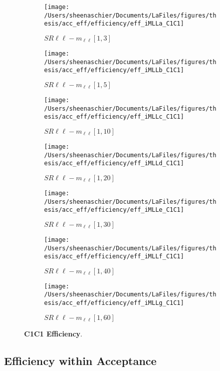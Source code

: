 \begin{figure}
        \centering
    \begin{subfigure}[b]{0.44\textwidth}
        \texttt{[image: /Users/sheenaschier/Documents/LaFiles/figures/thesis/acc\_eff/efficiency/eff\_iMLLa\_C1C1]}
    \caption{$SR\ell\ell-m_{\ell\ell} [1, 3]$}
    \end{subfigure}
    \begin{subfigure}[b]{0.44\textwidth}
        \texttt{[image: /Users/sheenaschier/Documents/LaFiles/figures/thesis/acc\_eff/efficiency/eff\_iMLLb\_C1C1]}
    \caption{$SR\ell\ell-m_{\ell\ell} [1, 5]$}
    \end{subfigure}
    \begin{subfigure}[b]{0.44\textwidth}
        \texttt{[image: /Users/sheenaschier/Documents/LaFiles/figures/thesis/acc\_eff/efficiency/eff\_iMLLc\_C1C1]}
    \caption{$SR\ell\ell-m_{\ell\ell} [1, 10]$}
    \end{subfigure}
    \begin{subfigure}[b]{0.44\textwidth}
        \texttt{[image: /Users/sheenaschier/Documents/LaFiles/figures/thesis/acc\_eff/efficiency/eff\_iMLLd\_C1C1]}
    \caption{$SR\ell\ell-m_{\ell\ell} [1, 20]$}
    \end{subfigure}
    \begin{subfigure}[b]{0.44\textwidth}
        \texttt{[image: /Users/sheenaschier/Documents/LaFiles/figures/thesis/acc\_eff/efficiency/eff\_iMLLe\_C1C1]}
    \caption{$SR\ell\ell-m_{\ell\ell} [1, 30]$}
    \end{subfigure}
    \begin{subfigure}[b]{0.44\textwidth}
        \texttt{[image: /Users/sheenaschier/Documents/LaFiles/figures/thesis/acc\_eff/efficiency/eff\_iMLLf\_C1C1]}
    \caption{$SR\ell\ell-m_{\ell\ell} [1, 40]$}
    \end{subfigure}
    \begin{subfigure}[b]{0.44\textwidth}
        \texttt{[image: /Users/sheenaschier/Documents/LaFiles/figures/thesis/acc\_eff/efficiency/eff\_iMLLg\_C1C1]}
    \caption{$SR\ell\ell-m_{\ell\ell} [1, 60]$}
    \end{subfigure}
    \caption{\label{fig:c1c1_efficiency}\textbf{C1C1 Efficiency}.}
\end{figure}

\FloatBarrier
\subsection{Efficiency within Acceptance}

